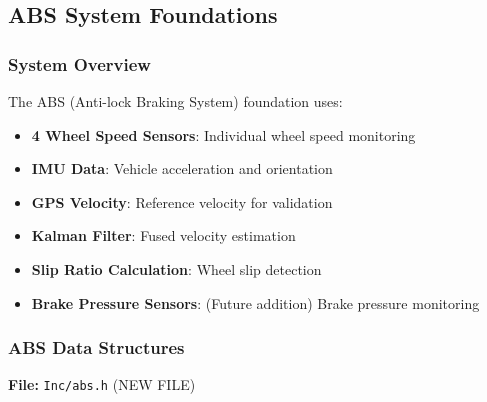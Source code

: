\documentclass[11pt,a4paper]{article}
\begin{document}
\subsection{ABS System Foundations}

\subsubsection{System Overview}

The ABS (Anti-lock Braking System) foundation uses:
\begin{itemize}
    \item \textbf{4 Wheel Speed Sensors}: Individual wheel speed monitoring
    \item \textbf{IMU Data}: Vehicle acceleration and orientation
    \item \textbf{GPS Velocity}: Reference velocity for validation
    \item \textbf{Kalman Filter}: Fused velocity estimation
    \item \textbf{Slip Ratio Calculation}: Wheel slip detection
    \item \textbf{Brake Pressure Sensors}: (Future addition) Brake pressure monitoring
\end{itemize}

\subsubsection{ABS Data Structures}

\textbf{File:} \texttt{Inc/abs.h} (NEW FILE)
\end{document}
